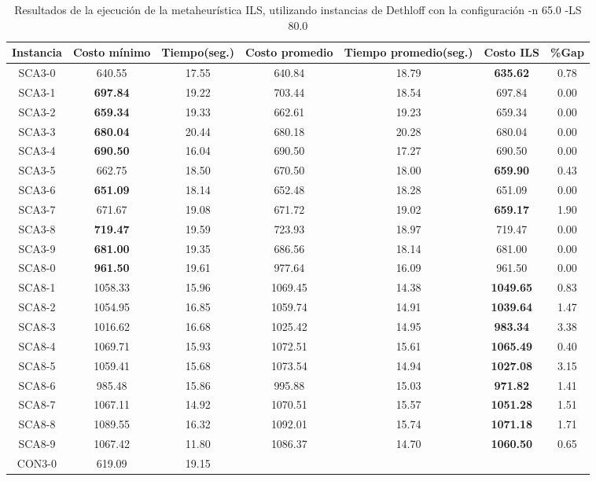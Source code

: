 \begin{table}[ht]
\caption{Resultados de la ejecución de la metaheurística ILS, utilizando instancias de Dethloff con la configuración -n 65.0 -LS 80.0}
\centering
\small
\begin{tabular}{c c c c c c c}
\hline\hline
Instancia & Costo mínimo & Tiempo(seg.) & Costo promedio & Tiempo promedio(seg.) & Costo ILS & \%Gap \\ [0.5ex]
\hline
SCA3-0 & 640.55 & 17.55 & 
640.84 & 18.79 & \bf{635.62} & 
0.78\\SCA3-1 & \bf{697.84} & 19.22 & 
703.44 & 18.54 & 697.84 & 0.00\\
SCA3-2 & \bf{659.34} & 19.33 & 
662.61 & 19.23 & 659.34 & 0.00\\
SCA3-3 & \bf{680.04} & 20.44 & 
680.18 & 20.28 & 680.04 & 0.00\\
SCA3-4 & \bf{690.50} & 16.04 & 
690.50 & 17.27 & 690.50 & 0.00\\
SCA3-5 & 662.75 & 18.50 & 
670.50 & 18.00 & \bf{659.90} & 
0.43\\SCA3-6 & \bf{651.09} & 18.14 & 
652.48 & 18.28 & 651.09 & 0.00\\
SCA3-7 & 671.67 & 19.08 & 
671.72 & 19.02 & \bf{659.17} & 
1.90\\SCA3-8 & \bf{719.47} & 19.59 & 
723.93 & 18.97 & 719.47 & 0.00\\
SCA3-9 & \bf{681.00} & 19.35 & 
686.56 & 18.14 & 681.00 & 0.00\\
SCA8-0 & \bf{961.50} & 19.61 & 
977.64 & 16.09 & 961.50 & 0.00\\
SCA8-1 & 1058.33 & 15.96 & 
1069.45 & 14.38 & \bf{1049.65} & 
0.83\\SCA8-2 & 1054.95 & 16.85 & 
1059.74 & 14.91 & \bf{1039.64} & 
1.47\\SCA8-3 & 1016.62 & 16.68 & 
1025.42 & 14.95 & \bf{983.34} & 
3.38\\SCA8-4 & 1069.71 & 15.93 & 
1072.51 & 15.61 & \bf{1065.49} & 
0.40\\SCA8-5 & 1059.41 & 15.68 & 
1073.54 & 14.94 & \bf{1027.08} & 
3.15\\SCA8-6 & 985.48 & 15.86 & 
995.88 & 15.03 & \bf{971.82} & 
1.41\\SCA8-7 & 1067.11 & 14.92 & 
1070.51 & 15.57 & \bf{1051.28} & 
1.51\\SCA8-8 & 1089.55 & 16.32 & 
1092.01 & 15.74 & \bf{1071.18} & 
1.71\\SCA8-9 & 1067.42 & 11.80 & 
1086.37 & 14.70 & \bf{1060.50} & 
0.65\\CON3-0 & 619.09 & 19.15 & 

\end{tabular}
\end{table}

